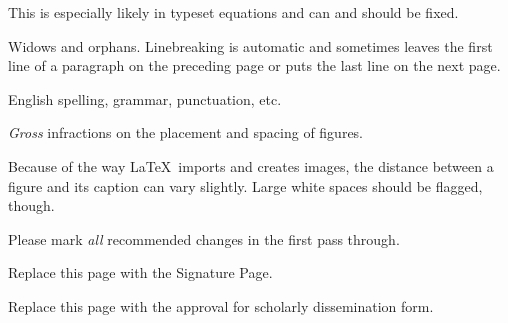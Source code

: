 \documentclass{LA_Tech}
\renewenvironment{itemize}{%
\vspace{-.15in} %
    \begin{olditemize}%
\setlength{\parsep}{0ex}
\setlength{\topsep}{0ex}
\setlength{\partopsep}{0ex}
      \setlength{\parskip}{0pt}%
      \setlength{\itemsep}{0pt}%
  }%
  {%
    \end{olditemize}%
  }
\numberwithin{equation}{chapter}
\begin{document}
\begin{singlespace}
\begin{itemize}
\begin{itemize}
This is especially likely in typeset equations and can and should be
fixed.

\item
Widows and orphans. Linebreaking is automatic and sometimes
leaves the first line of a paragraph on the preceding page or
puts the last line on the next page.

\item
English spelling, grammar, punctuation, etc.

\item
{\em Gross} infractions on the placement and spacing of figures.

Because of the way \LaTeX \ imports and creates images,
the distance between a figure and its caption can vary slightly.
Large white spaces should be flagged, though.

\end{itemize}

\item
Please mark {\em all} recommended changes in the first
pass through.

\end{itemize}

\end{singlespace}


\clearpage

\setcounter{page}{0}

\thispagestyle{empty}



\newpage

\thispagestyle{empty}
Replace this page with the Signature Page.


\newpage





\vfill\vfill
\newpage
\thispagestyle{empty}
Replace this page with the approval for
scholarly dissemination form.


\newpage



\newpage



\end{document}

